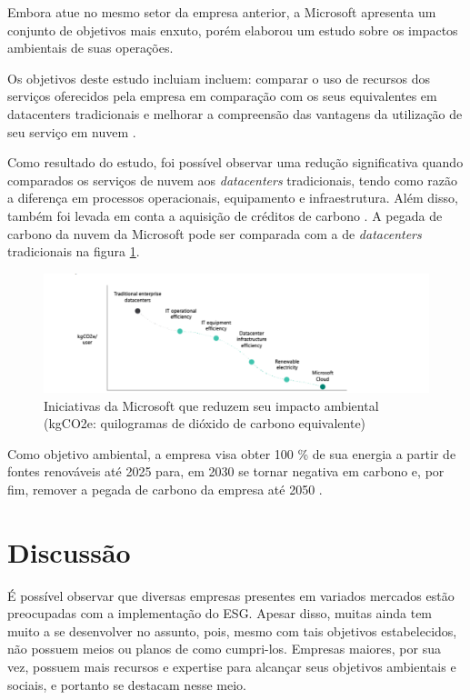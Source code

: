 \documentclass[12pt]{article}
\begin{document}
	Embora atue no mesmo setor da empresa anterior, a Microsoft apresenta um conjunto de objetivos mais enxuto, porém elaborou um estudo sobre os impactos ambientais de suas operações.
	
	Os objetivos deste estudo incluiam incluem: comparar o uso de recursos dos serviços oferecidos pela empresa em comparação com os seus equivalentes em datacenters tradicionais e melhorar a compreensão das vantagens da utilização de seu serviço em nuvem \cite{microsoftCarbonBenefitsCloud2020}.
	
	Como resultado do estudo, foi possível observar uma redução significativa quando comparados os serviços de nuvem aos \emph{datacenters} tradicionais, tendo como razão a diferença em processos operacionais, equipamento e infraestrutura. Além disso, também foi levada em conta a aquisição de créditos de carbono \cite{microsoftCarbonBenefitsCloud2020}. A pegada de carbono da nuvem da Microsoft pode ser comparada com a de \emph{datacenters} tradicionais na figura \ref{fig:microsoft-intiatives}.
	
	\begin{figure}[h]
		\centering
		\includegraphics[width=0.7\linewidth]{pictures/microsoft-intiatives}
		\caption{Iniciativas da Microsoft que reduzem seu impacto ambiental (kgCO2e: quilogramas de dióxido de carbono equivalente)}
		\label{fig:microsoft-intiatives}
	\end{figure}
	
	Como objetivo ambiental, a empresa visa obter 100 \% de sua energia a partir de fontes renováveis até 2025 para, em 2030 se tornar negativa em carbono e, por fim, remover a pegada de carbono da empresa até 2050 \cite{microsoftCarbonBenefitsCloud2020}.
	
	\section*{Discussão}
	
	É possível observar que diversas empresas presentes em variados mercados estão preocupadas com a implementação do ESG. Apesar disso, muitas ainda tem muito a se desenvolver no assunto, pois, mesmo com tais objetivos estabelecidos, não possuem meios ou planos de como cumpri-los. Empresas maiores, por sua vez, possuem mais recursos e expertise para alcançar seus objetivos ambientais e sociais, e portanto se destacam nesse meio.
	
\end{document}
